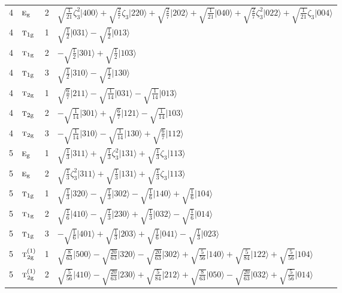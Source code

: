 \documentclass[11pt]{article}
\newcommand{\irr}[1]{\text{\normalfont\scshape #1}}
\newcommand{\ptag}[1]{\mathrm{#1}}
\newcommand{\rootunity}[1]{\zeta_{#1}}
\newcommand{\occ}[1]{\lvert #1\rangle}
\begin{document}
\begin{longtable}{c l c p{}}
4 & $\irr{e}_{\ptag{g}}$ & 2 & $\sqrt{\tfrac{1}{21}}\rootunity{3}^{2}\occ{400}+\sqrt{\tfrac{2}{7}}\rootunity{3}\occ{220}+\sqrt{\tfrac{2}{7}}\occ{202}+\sqrt{\tfrac{1}{21}}\occ{040}+\sqrt{\tfrac{2}{7}}\rootunity{3}^{2}\occ{022}+\sqrt{\tfrac{1}{21}}\rootunity{3}\occ{004}$\\
4 & $\irr{t}_{1\ptag{g}}$ & 1 & $\sqrt{\tfrac{1}{2}}\occ{031}-\sqrt{\tfrac{1}{2}}\occ{013}$\\
4 & $\irr{t}_{1\ptag{g}}$ & 2 & $-\sqrt{\tfrac{1}{2}}\occ{301}+\sqrt{\tfrac{1}{2}}\occ{103}$\\
4 & $\irr{t}_{1\ptag{g}}$ & 3 & $\sqrt{\tfrac{1}{2}}\occ{310}-\sqrt{\tfrac{1}{2}}\occ{130}$\\
4 & $\irr{t}_{2\ptag{g}}$ & 1 & $\sqrt{\tfrac{6}{7}}\occ{211}-\sqrt{\tfrac{1}{14}}\occ{031}-\sqrt{\tfrac{1}{14}}\occ{013}$\\
4 & $\irr{t}_{2\ptag{g}}$ & 2 & $-\sqrt{\tfrac{1}{14}}\occ{301}+\sqrt{\tfrac{6}{7}}\occ{121}-\sqrt{\tfrac{1}{14}}\occ{103}$\\
4 & $\irr{t}_{2\ptag{g}}$ & 3 & $-\sqrt{\tfrac{1}{14}}\occ{310}-\sqrt{\tfrac{1}{14}}\occ{130}+\sqrt{\tfrac{6}{7}}\occ{112}$\\
\hline
5 & $\irr{e}_{\ptag{g}}$ & 1 & $\sqrt{\tfrac{1}{3}}\occ{311}+\sqrt{\tfrac{1}{3}}\rootunity{3}^{2}\occ{131}+\sqrt{\tfrac{1}{3}}\rootunity{3}\occ{113}$\\
5 & $\irr{e}_{\ptag{g}}$ & 2 & $\sqrt{\tfrac{1}{3}}\rootunity{3}^{2}\occ{311}+\sqrt{\tfrac{1}{3}}\occ{131}+\sqrt{\tfrac{1}{3}}\rootunity{3}\occ{113}$\\
5 & $\irr{t}_{1\ptag{g}}$ & 1 & $\sqrt{\tfrac{1}{3}}\occ{320}-\sqrt{\tfrac{1}{3}}\occ{302}-\sqrt{\tfrac{1}{6}}\occ{140}+\sqrt{\tfrac{1}{6}}\occ{104}$\\
5 & $\irr{t}_{1\ptag{g}}$ & 2 & $\sqrt{\tfrac{1}{6}}\occ{410}-\sqrt{\tfrac{1}{3}}\occ{230}+\sqrt{\tfrac{1}{3}}\occ{032}-\sqrt{\tfrac{1}{6}}\occ{014}$\\
5 & $\irr{t}_{1\ptag{g}}$ & 3 & $-\sqrt{\tfrac{1}{6}}\occ{401}+\sqrt{\tfrac{1}{3}}\occ{203}+\sqrt{\tfrac{1}{6}}\occ{041}-\sqrt{\tfrac{1}{3}}\occ{023}$\\
5 & $\irr{t}_{2\ptag{g}}^{(1)}$ & 1 & $\sqrt{\tfrac{8}{63}}\occ{500}-\sqrt{\tfrac{20}{63}}\occ{320}-\sqrt{\tfrac{20}{63}}\occ{302}+\sqrt{\tfrac{5}{56}}\occ{140}+\sqrt{\tfrac{5}{84}}\occ{122}+\sqrt{\tfrac{5}{56}}\occ{104}$\\
5 & $\irr{t}_{2\ptag{g}}^{(1)}$ & 2 & $\sqrt{\tfrac{5}{56}}\occ{410}-\sqrt{\tfrac{20}{63}}\occ{230}+\sqrt{\tfrac{5}{84}}\occ{212}+\sqrt{\tfrac{8}{63}}\occ{050}-\sqrt{\tfrac{20}{63}}\occ{032}+\sqrt{\tfrac{5}{56}}\occ{014}$\\

\end{longtable}
\end{document}
